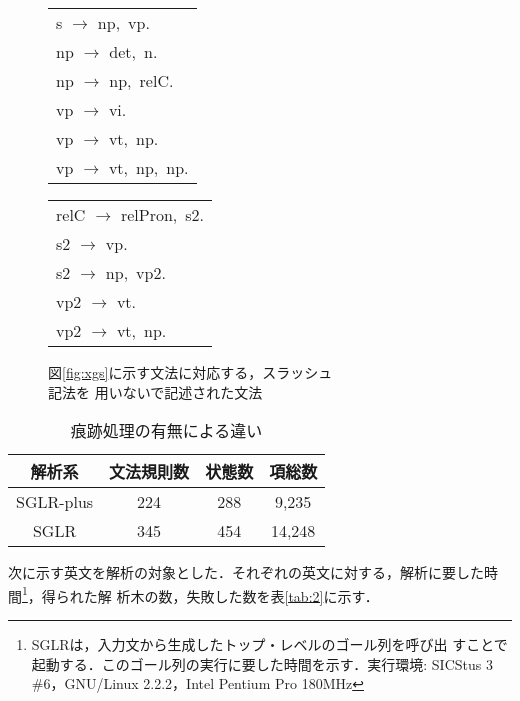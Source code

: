\begin{figure}[htbp]
  \begin{center}
    \begin{minipage}[t]{3.1cm}
      \begin{tabular}[t]{l}
        s $\to$ np,\ vp.\\
        np $\to$ det,\ n.\\
        np $\to$ np,\ relC.\\
        vp $\to$ vi.\\
        vp $\to$ vt,\ np.\\
        vp $\to$ vt,\ np,\ np.
      \end{tabular}
    \end{minipage}
    \begin{minipage}[t]{4cm}
      \begin{tabular}[t]{l}
        relC $\to$ relPron,\ s2.\\
        s2 $\to$ vp.\\
        s2 $\to$ np,\ vp2.\\
        vp2 $\to$ vt.\\ 
        vp2 $\to$ vt,\ np. 
      \end{tabular}
    \end{minipage}
    \caption{図\ref{fig:xgs}に示す文法に対応する，スラッシュ\\記法を
      用いないで記述された文法}
    \label{fig:cfg2}
  \end{center}
\end{figure}

\begin{table}[htbp]
  \begin{center}
    \caption{痕跡処理の有無による違い}
    \label{tab:1}
    \begin{tabular}[htbp]{|c||c|c|c|}              \hline
      解析系    & 文法規則数 & 状態数 & 項総数 \\ \hline\hline
      SGLR-plus & 224        & 288    & 9,235    \\ \hline
      SGLR      & 345        & 454    & 14,248   \\ \hline
    \end{tabular}
  \end{center}
\end{table}

次に示す英文を解析の対象とした．それぞれの英文に対する，解析に要した時
間\footnote{SGLRは，入力文から生成したトップ・レベルのゴール列を呼び出
すことで起動する．このゴール列の実行に要した時間を示す．実行環境:
SICStus 3 \#6，GNU/Linux 2.2.2，Intel Pentium Pro 180MHz}，得られた解
析木の数，失敗した数を表\ref{tab:2}に示す．

